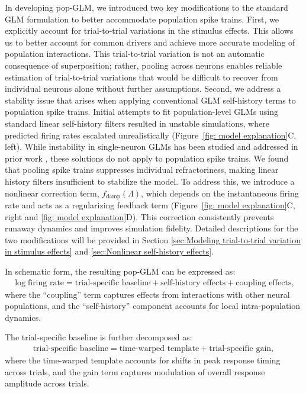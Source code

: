 \documentclass[12pt]{article}
\begin{document}
In developing pop-GLM, we introduced two key modifications to the standard GLM formulation to better accommodate population spike trains. First, we explicitly account for trial-to-trial variations in the stimulus effects. This allows us to better account for common drivers and achieve more accurate modeling of population interactions. This trial-to-trial variation is not an automatic consequence of superposition; rather, pooling across neurons enables reliable estimation of trial-to-trial variations that would be difficult to recover from individual neurons alone without further assumptions. Second, we address a stability issue that arises when applying conventional GLM self-history terms to population spike trains. Initial attempts to fit population-level GLMs using standard linear self-history filters resulted in unstable simulations, where predicted firing rates escalated unrealistically (Figure~\ref{fig: model explanation}C, left). While instability in single-neuron GLMs has been studied and addressed in prior work \cite{chen2019stability, hocker2017multistep, gerhard2017stability, park2013spectral, arribas2020rescuing}, these solutions do not apply to population spike trains. We found that pooling spike trains suppresses individual refractoriness, making linear history filters insufficient to stabilize the model. To address this, we introduce a nonlinear correction term, $f_{\text{damp}}(\Lambda)$, which depends on the instantaneous firing rate and acts as a regularizing feedback term (Figure~\ref{fig: model explanation}C, right and \ref{fig: model explanation}D). This correction consistently prevents runaway dynamics and improves simulation fidelity. Detailed descriptions for the two modifications will be provided in Section \ref{sec:Modeling trial-to-trial variation in stimulus effects} and \ref{sec:Nonlinear self-history effects}.

In schematic form, the resulting pop-GLM can be expressed as:
\begin{align*}
\log \text{firing rate} = \text{trial-specific baseline} + \text{self-history effects} + \text{coupling effects},
\end{align*}
where the ``coupling'' term captures effects from interactions with other neural populations, and the ``self-history'' component accounts for local intra-population dynamics.

The trial-specific baseline is further decomposed as:
\begin{align*}
\text{trial-specific baseline} = \text{time-warped template} + \text{trial-specific gain},
\end{align*}
where the time-warped template accounts for shifts in peak response timing across trials, and the gain term captures modulation of overall response amplitude across trials.
\end{document}
